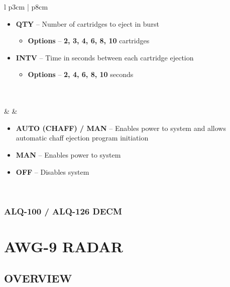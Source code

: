 \documentclass[10pt,usenames,dvipsnames,twoside]{report}
\begin{document}
\begin{center}
\begin{longtable}{l p{3cm} | p{8cm}}
\begin{minipage}[t]{\linewidth}
				\vspace{-7pt}
				\begin{itemize}
					\item \textbf{QTY} -- Number of cartridges to eject in burst
					\begin{itemize}
						\item \textbf{Options} -- \textbf{2, 3, 4, 6, 8, 10} cartridges
					\end{itemize}
					\item \textbf{INTV} -- Time in seconds between each cartridge ejection
					\begin{itemize}
						\item \textbf{Options} -- \textbf{2, 4, 6, 8, 10} seconds
					\end{itemize}
				\end{itemize}
			\end{minipage} \\
			\midrule
			 \\
			\midrule
			\textbullet &   &
			\begin{minipage}[t]{\linewidth}
				\vspace{-7pt}
				\begin{itemize}
					\item \textbf{AUTO (CHAFF) / MAN} -- Enables power to system and allows automatic chaff ejection program initiation
					\item \textbf{MAN} -- Enables power to system
					\item \textbf{OFF} -- Disables system
				\end{itemize}
			\end{minipage} \\
			\bottomrule
		\end{longtable}
	\end{center}

	\subsection{ALQ-100 / ALQ-126 DECM}

	\cleardoublepage

	\chapter{AWG-9 RADAR}
	\minitoc
	\cleardoublepage

	\section{OVERVIEW}
\end{document}
